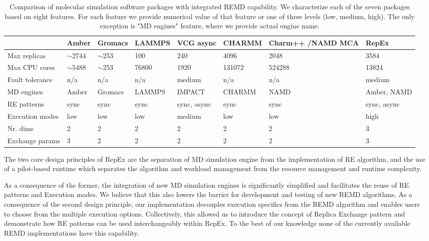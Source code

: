 \documentclass{sig-alternate-05-2015}
\begin{document}
\begin{table*}[ht!]
  \begin{center}
  \begin{tabular}{| p{2.5cm} || p{1.2cm}| p{1.4cm} | p{1.6cm} | p{1.8cm} | p{1.8cm} | p{2.4cm} | p{1.6cm} |} 
  \hline
   & \textbf{Amber} & \textbf{Gromacs} & \textbf{LAMMPS} & \textbf{VCG async} & \textbf{CHARMM} & \textbf{Charm++ /NAMD MCA} & \textbf{RepEx}\\
  \hline
  \hline
  Max replicas & $\sim$2744 & $\sim$253 & 100 & 240 & 4096 & 2048 & 3584 \\ 
  \hline
  Max CPU cores & $\sim$5488 & $\sim$253 & 76800 & 1920 & 131072 & 524288 & 13824 \\ 
  \hline
  Fault tolerance & n/a & n/a & n/a & medium & n/a & n/a & medium \\  
  \hline
  MD engines & Amber & Gromacs & LAMMPS & IMPACT & CHARMM & NAMD & Amber, NAMD \\  
  \hline
  RE patterns & sync & sync & sync & sync, async & sync & sync & sync, async \\ 
  \hline
  Execution modes & low & low & low & medium & low & low & high \\ 
  \hline
  Nr. dims & 2 & 2 & 2 & 2 & 2 & 2 & 3 \\ 
  \hline
  Exchange params & 3 & 2 & 2 & 2 & 2 & 2 & 3 \\ 
  \hline
  \end{tabular}
  \end{center}
  \caption{\small{Comparison of molecular simulation software packages with integrated REMD capability. We characterize each of the seven packages based on eight features. For each feature we provide numerical value of that feature or one of three levels (low, medium, high). The only exception is "MD engines" feature, where we provide actual engine name.}}\label{table:compare}
\end{table*}

The two core design principles of RepEx are the separation of MD simulation engine from the implementation of RE algorithm, and the use of a pilot-based runtime which separates the algorithm and workload management from the resource management and runtime complexity.

As a consequence of the former, the integration of new MD simulation engines is significantly simplified and facilitates the reuse of RE patterns and Execution modes. We believe that this also lowers the barrier for development and testing of new REMD algorithms.  As a consequence of the second design principle, our implementation decouples execution specifics from the REMD algorithm and enables users to choose from the multiple execution options.  Collectively, this allowed us to introduce the concept of Replica Exchange pattern and demonstrate how RE patterns can be used interchangeably within RepEx. To the best of our knowledge none of the currently available REMD implementations have this capability.
\end{document}
